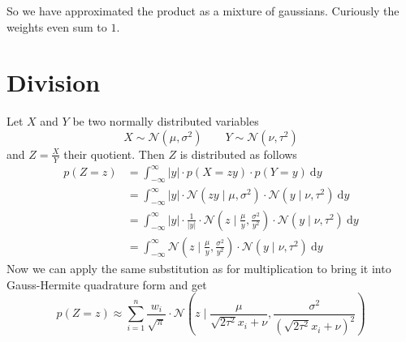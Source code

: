 \documentclass[11pt,a4paper]{book}
\begin{document}
So we have approximated the product as a mixture of gaussians. Curiously the
weights even sum to $1$.

\section{Division}

Let $X$ and $Y$ be two normally distributed variables
\begin{equation*}
  X \sim \mathcal{N}(\mu, \sigma^{2}) \qquad Y \sim \mathcal{N}(\nu, \tau^{2})
\end{equation*}
and $Z = \frac{X}{Y}$ their quotient. Then $Z$ is distributed as follows
\begin{align*}
  p(Z = z) & = \int_{-\infty}^{\infty} |y| \cdot p\left(X = zy\right) \cdot p(Y = y)~\mathrm{d}y\\
           & = \int_{-\infty}^{\infty} |y| \cdot \mathcal{N}\left( zy \mid \mu, \sigma^{2} \right) \cdot \mathcal{N}(y \mid \nu, \tau^{2})~\mathrm{d}y\\
           & = \int_{-\infty}^{\infty} |y| \cdot \frac{1}{|y|} \cdot \mathcal{N}\left( z \mid \frac{\mu}{y}, \frac{\sigma^{2}}{y^{2}} \right) \cdot \mathcal{N}(y \mid \nu, \tau^{2})~\mathrm{d}y\\
           & = \int_{-\infty}^{\infty} \mathcal{N}\left( z \mid \frac{\mu}{y}, \frac{\sigma^{2}}{y^{2}} \right) \cdot \mathcal{N}(y \mid \nu, \tau^{2})~\mathrm{d}y
\end{align*}
Now we can apply the same substitution as for multiplication to bring it into
Gauss-Hermite quadrature form and get
\begin{equation*}
  p(Z = z) \approx \sum_{i = 1}^{n} \frac{w_{i}}{\sqrt{\pi}} \cdot \mathcal{N}\left( z \mid \frac{\mu}{\sqrt{2 \tau^{2}} x_{i} + \nu}, \frac{\sigma^{2}}{\left(\sqrt{2 \tau^{2}} x_{i} + \nu\right)^{2}} \right)
\end{equation*}

\printbibliography
\end{document}
